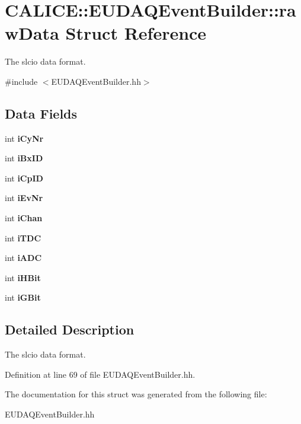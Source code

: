 \section{C\-A\-L\-I\-C\-E\-:\-:E\-U\-D\-A\-Q\-Event\-Builder\-:\-:raw\-Data Struct Reference}
\label{structCALICE_1_1EUDAQEventBuilder_1_1rawData}


The slcio data format.  




{\ttfamily \#include $<$E\-U\-D\-A\-Q\-Event\-Builder.\-hh$>$}

\subsection*{Data Fields}
\begin{DoxyCompactItemize}
\item 
int {\bfseries i\-Cy\-Nr}\label{structCALICE_1_1EUDAQEventBuilder_1_1rawData_a006628d4355eff92eedfa9a6cd750c1f}

\item 
int {\bfseries i\-Bx\-I\-D}\label{structCALICE_1_1EUDAQEventBuilder_1_1rawData_a2212434bb5aaf722fb96d9c40c7b4d51}

\item 
int {\bfseries i\-Cp\-I\-D}\label{structCALICE_1_1EUDAQEventBuilder_1_1rawData_aaf2e66f34599ecd9a7ec6eba19e7946e}

\item 
int {\bfseries i\-Ev\-Nr}\label{structCALICE_1_1EUDAQEventBuilder_1_1rawData_ad098fe7746808f4d3401d1c2a40f646f}

\item 
int {\bfseries i\-Chan}\label{structCALICE_1_1EUDAQEventBuilder_1_1rawData_a622d82b2d99fe835f2e587d3f7e20724}

\item 
int {\bfseries i\-T\-D\-C}\label{structCALICE_1_1EUDAQEventBuilder_1_1rawData_abad5c342509389ba287acc4e5a326276}

\item 
int {\bfseries i\-A\-D\-C}\label{structCALICE_1_1EUDAQEventBuilder_1_1rawData_ad2301901a9a551c242b2d25e22654b4d}

\item 
int {\bfseries i\-H\-Bit}\label{structCALICE_1_1EUDAQEventBuilder_1_1rawData_ae4b96f164ea2de6026eb4c1273da263a}

\item 
int {\bfseries i\-G\-Bit}\label{structCALICE_1_1EUDAQEventBuilder_1_1rawData_a3f8979de8030b4108bd673971db3104f}

\end{DoxyCompactItemize}


\subsection{Detailed Description}
The slcio data format. 

Definition at line 69 of file E\-U\-D\-A\-Q\-Event\-Builder.\-hh.



The documentation for this struct was generated from the following file\-:\begin{DoxyCompactItemize}
\item 
E\-U\-D\-A\-Q\-Event\-Builder.\-hh\end{DoxyCompactItemize}
